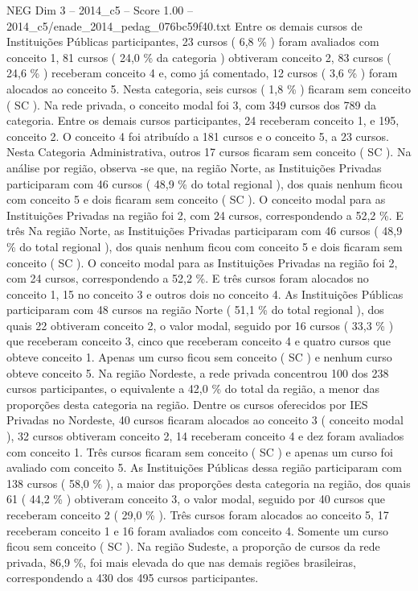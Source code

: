 \begin{textsample}{NEG Dim 3 – 2014\_c5 – Score 1.00 – 2014\_c5/enade\_2014\_pedag\_076bc59f40.txt}
Entre os demais cursos de Instituições Públicas participantes, 23 cursos ( 6,8 \% ) foram avaliados com conceito 1, 81 cursos ( 24,0 \% da categoria ) obtiveram conceito 2, 83 cursos ( 24,6 \% ) receberam conceito 4 e, como já comentado, 12 cursos ( 3,6 \% ) foram alocados ao conceito 5.
Nesta categoria, seis cursos ( 1,8 \% ) ficaram sem conceito ( SC ).
Na rede privada, o conceito modal foi 3, com 349 cursos dos 789 da categoria.
Entre os demais cursos participantes, 24 receberam conceito 1, e 195, conceito 2.
O conceito 4 foi atribuído a 181 cursos e o conceito 5, a 23 cursos.
Nesta Categoria Administrativa, outros 17 cursos ficaram sem conceito ( SC ).
Na análise por região, observa -se que, na região Norte, as Instituições Privadas participaram com 46 cursos ( 48,9 \% do total regional ), dos quais nenhum ficou com conceito 5 e dois ficaram sem conceito ( SC ).
O conceito modal para as Instituições Privadas na região foi 2, com 24 cursos, correspondendo a 52,2 \%.
E três Na região Norte, as Instituições Privadas participaram com 46 cursos ( 48,9 \% do total regional ), dos quais nenhum ficou com conceito 5 e dois ficaram sem conceito ( SC ).
O conceito modal para as Instituições Privadas na região foi 2, com 24 cursos, correspondendo a 52,2 \%.
E três cursos foram alocados no conceito 1, 15 no conceito 3 e outros dois no conceito 4.
As Instituições Públicas participaram com 48 cursos na região Norte ( 51,1 \% do total regional ), dos quais 22 obtiveram conceito 2, o valor modal, seguido por 16 cursos ( 33,3 \% ) que receberam conceito 3, cinco que receberam conceito 4 e quatro cursos que obteve conceito 1.
Apenas um curso ficou sem conceito ( SC ) e nenhum curso obteve conceito 5.
Na região Nordeste, a rede privada concentrou 100 dos 238 cursos participantes, o equivalente a 42,0 \% do total da região, a menor das proporções desta categoria na região.
Dentre os cursos oferecidos por IES Privadas no Nordeste, 40 cursos ficaram alocados ao conceito 3 ( conceito modal ), 32 cursos obtiveram conceito 2, 14 receberam conceito 4 e dez foram avaliados com conceito 1.
Três cursos ficaram sem conceito ( SC ) e apenas um curso foi avaliado com conceito 5.
As Instituições Públicas dessa região participaram com 138 cursos ( 58,0 \% ), a maior das proporções desta categoria na região, dos quais 61 ( 44,2 \% ) obtiveram conceito 3, o valor modal, seguido por 40 cursos que receberam conceito 2 ( 29,0 \% ).
Três cursos foram alocados ao conceito 5, 17 receberam conceito 1 e 16 foram avaliados com conceito 4.
Somente um curso ficou sem conceito ( SC ).
Na região Sudeste, a proporção de cursos da rede privada, 86,9 \%, foi mais elevada do que nas demais regiões brasileiras, correspondendo a 430 dos 495 cursos participantes.

\end{textsample}

